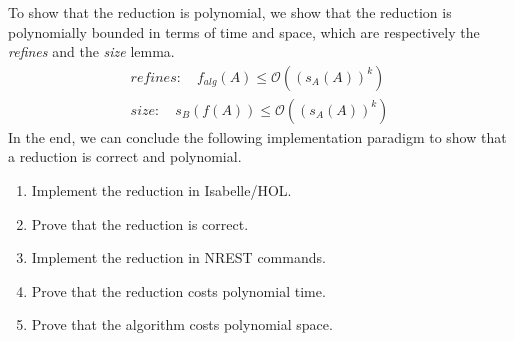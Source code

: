 To show that the reduction is polynomial, we show that the reduction is polynomially bounded in terms 
of time and space, which are respectively the \textit{refines} and the \textit{size} lemma.
\begin{align*}
    refines: \quad f_{alg}(A) \leq \mathcal{O}((s_A(A))^k) \\
    size: \quad s_B (f(A)) \leq \mathcal{O}((s_A(A))^k)
\end{align*}
In the end, we can conclude the following implementation paradigm to show that a reduction is correct and polynomial.
\begin{enumerate}
    \item Implement the reduction in Isabelle/HOL.
    \item Prove that the reduction is correct.
    \item Implement the reduction in NREST commands.
    \item Prove that the reduction costs polynomial time.
    \item Prove that the algorithm costs polynomial space.
\end{enumerate}
